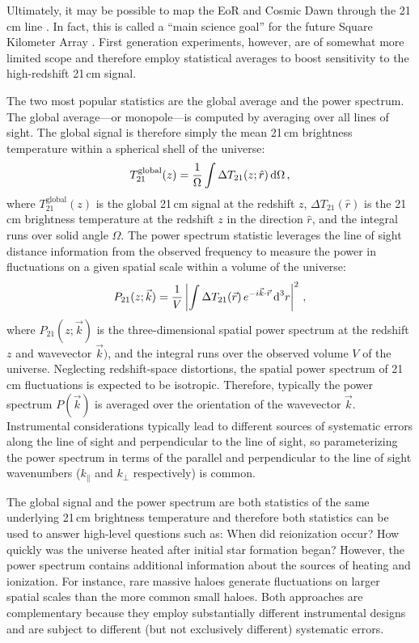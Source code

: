 \begin{bibunit}
Ultimately, it may be possible to map the EoR and Cosmic Dawn through the 21\,cm line
\citep{1997ApJ...475..429M}. In fact, this is called a ``main science goal'' for the future Square
Kilometer Array \citep[SKA;][]{2013ExA....36..235M}.  First generation experiments, however, are of
somewhat more limited scope and therefore employ statistical averages to boost sensitivity to the
high-redshift 21\,cm signal.

The two most popular statistics are the global average and the power spectrum. The global
average---or monopole---is computed by averaging over all lines of sight. The global signal is
therefore simply the mean 21\,cm brightness temperature within a spherical shell of the universe:
\begin{equation}
    T^\text{global}_{21}(z) = \frac{1}{\Omega}\int \Delta T_{21}(z; \hat{r}) \, {\textrm d}\Omega \,,
\end{equation}
where $T^\text{global}_{21}(z)$ is the global 21\,cm signal at the redshift $z$, $\Delta
T_{21}(\hat{r})$ is the 21\,cm brightness temperature at the redshift $z$ in the direction
$\hat{r}$, and the integral runs over solid angle $\Omega$.  The power spectrum statistic leverages
the line of sight distance information from the observed frequency to measure the power in
fluctuations on a given spatial scale within a volume of the universe:
\begin{equation}
    P_{21}(z; \vec{k}) =
        \frac{1}{V}\left|
        \int \Delta T_{21}(\vec{r}) \, e^{-i\vec{k}\cdot\vec{r}} \, {\textrm d}^3r
        \right|^2\,,
\end{equation}
where $P_{21}(z; \vec{k})$ is the three-dimensional spatial power spectrum at the redshift $z$ and
wavevector $\vec{k})$, and the integral runs over the observed volume $V$ of the universe.
Neglecting redshift-space distortions, the spatial power spectrum of 21\,cm fluctuations is expected
to be isotropic. Therefore, typically the power spectrum $P(\vec{k})$ is averaged over the
orientation of the wavevector $\vec{k}$. Instrumental considerations typically lead to different
sources of systematic errors along the line of sight and perpendicular to the line of sight, so
parameterizing the power spectrum in terms of the parallel and perpendicular to the line of sight
wavenumbers ($k_\parallel$ and $k_\perp$ respectively) is common.


The global signal and the power spectrum are both statistics of the same underlying 21\,cm
brightness temperature and therefore both statistics can be used to answer high-level questions such
as: When did reionization occur? How quickly was the universe heated after initial star formation
began?  However, the power spectrum contains additional information about the sources of heating and
ionization.  For instance, rare massive haloes generate fluctuations on larger spatial scales than
the more common small haloes.  Both approaches are complementary because they employ substantially
different instrumental designs and are subject to different (but not exclusively different)
systematic errors.


\end{bibunit}
